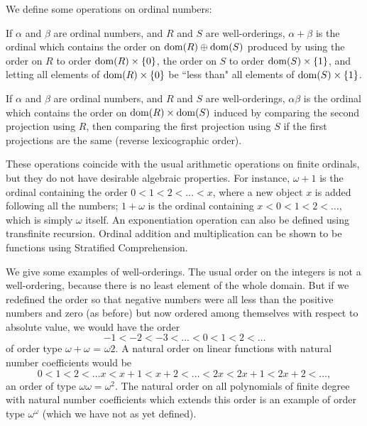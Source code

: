We define some operations on ordinal numbers:

\begin{definition}
 If $\alpha$ and $\beta$ are ordinal numbers, and $R$ and $S$ are
 well-orderings, $\alpha + \beta$ is the ordinal which
 contains the order on $\mathop{\mathrm{dom}}(R) \oplus \mathop{\mathrm{dom}}(S)$ produced by using the order on
 $R$ to order $\mathop{\mathrm{dom}}(R) \times \{0\}$, the order on $S$ to order $\mathop{\mathrm{dom}}(S) \times
 \{1\}$, and letting all elements of $\mathop{\mathrm{dom}}(R) \times \{0\}$ be ``less than" all
 elements of $\mathop{\mathrm{dom}}(S) \times \{1\}$.
\end{definition}

\begin{definition}
 If $\alpha$ and $\beta$ are ordinal numbers, and $R$ and $S$ are
 well-orderings, $\alpha\beta$ is the ordinal which
 contains the order on $\mathop{\mathrm{dom}}(R) \times \mathop{\mathrm{dom}}(S)$ induced by comparing the second
 projection using $R$, then comparing the first projection using $S$ if the
 first projections are the same (reverse lexicographic
 order).
\end{definition}

These operations coincide with the usual arithmetic operations
on finite ordinals, but they do
not have desirable algebraic properties.  For instance, $\omega + 1$ is the
ordinal containing the order $0 < 1 < 2 < \ldots < x$, where a new object $x$
is added following all the numbers; $1 + \omega$ is the ordinal containing $x <
0 < 1 < 2< \ldots,$ which is simply $\omega$ itself.  An
exponentiation
operation can also be defined using transfinite
recursion.  Ordinal 
addition and multiplication can be shown to be functions using 
Stratified Comprehension.

We give some examples of well-orderings.  The usual
order on the integers is not a well-ordering, because
there is no least element of the whole domain.  But if we redefined the order
so that negative numbers were all less than the positive numbers and zero (as
before) but now ordered among themselves with respect to absolute value, we
would have the order
$$
  -1 < -2 < -3 < \ldots < 0 < 1 < 2 <\ldots
$$
of order type $\omega + \omega$ = $\omega 2$.  A natural
order on linear functions with natural number
coefficients would be
$$
  0 < 1 < 2 < \ldots x < x+1 < x+2 < \ldots < 2x < 2x+1 < 2x+2 < \ldots,
$$
an order
of type $\omega\omega = \omega^2$.  The natural order on all
polynomials of finite degree with natural number coefficients which
extends this order is an example of order type $\omega^\omega$ (which
we have not as yet defined).



